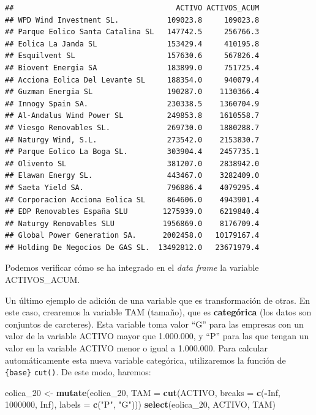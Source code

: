 \documentclass[
]{book}
\newenvironment{Shaded}{\begin{snugshade}}{\end{snugshade}}
\newcommand{\AttributeTok}[1]{\textcolor[rgb]{0.13,0.29,0.53}{#1}}
\newcommand{\ConstantTok}[1]{\textcolor[rgb]{0.56,0.35,0.01}{#1}}
\newcommand{\DecValTok}[1]{\textcolor[rgb]{0.00,0.00,0.81}{#1}}
\newcommand{\FunctionTok}[1]{\textcolor[rgb]{0.13,0.29,0.53}{\textbf{#1}}}
\newcommand{\NormalTok}[1]{#1}
\newcommand{\OtherTok}[1]{\textcolor[rgb]{0.56,0.35,0.01}{#1}}
\newcommand{\SpecialCharTok}[1]{\textcolor[rgb]{0.81,0.36,0.00}{\textbf{#1}}}
\newcommand{\StringTok}[1]{\textcolor[rgb]{0.31,0.60,0.02}{#1}}
\begin{document}
\begin{verbatim}
##                                     ACTIVO ACTIVOS_ACUM
## WPD Wind Investment SL.           109023.8     109023.8
## Parque Eolico Santa Catalina SL   147742.5     256766.3
## Eolica La Janda SL                153429.4     410195.8
## Esquilvent SL                     157630.6     567826.4
## Biovent Energia SA                183899.0     751725.4
## Acciona Eolica Del Levante SL     188354.0     940079.4
## Guzman Energia SL                 190287.0    1130366.4
## Innogy Spain SA.                  230338.5    1360704.9
## Al-Andalus Wind Power SL          249853.8    1610558.7
## Viesgo Renovables SL.             269730.0    1880288.7
## Naturgy Wind, S.L.                273542.0    2153830.7
## Parque Eolico La Boga SL.         303904.4    2457735.1
## Olivento SL                       381207.0    2838942.0
## Elawan Energy SL.                 443467.0    3282409.0
## Saeta Yield SA.                   796886.4    4079295.4
## Corporacion Acciona Eolica SL     864606.0    4943901.4
## EDP Renovables España SLU        1275939.0    6219840.4
## Naturgy Renovables SLU           1956869.0    8176709.4
## Global Power Generation SA.      2002458.0   10179167.4
## Holding De Negocios De GAS SL.  13492812.0   23671979.4
\end{verbatim}

Podemos verificar cómo se ha integrado en el \emph{data frame} la variable ACTIVOS\_ACUM.

Un último ejemplo de adición de una variable que es transformación de otras. En este caso, crearemos la variable TAM (tamaño), que es \textbf{categórica} (los datos son conjuntos de carcteres). Esta variable toma valor ``G'' para las empresas con un valor de la variable ACTIVO mayor que 1.000.000, y ``P'' para las que tengan un valor en la variable ACTIVO menor o igual a 1.000.000. Para calcular automáticamente esta nueva variable categórica, utilizaremos la función de \texttt{\{base\}} \texttt{cut()}. De este modo, haremos:

\begin{Shaded}
\begin{Highlighting}[]
\NormalTok{eolica\_20 }\OtherTok{\textless{}{-}} \FunctionTok{mutate}\NormalTok{(eolica\_20, }\AttributeTok{TAM =} \FunctionTok{cut}\NormalTok{(ACTIVO,}
  \AttributeTok{breaks =} \FunctionTok{c}\NormalTok{(}\SpecialCharTok{{-}}\ConstantTok{Inf}\NormalTok{, }\DecValTok{1000000}\NormalTok{, }\ConstantTok{Inf}\NormalTok{), }\AttributeTok{labels =} \FunctionTok{c}\NormalTok{(}\StringTok{"P"}\NormalTok{, }\StringTok{"G"}\NormalTok{)))}
\FunctionTok{select}\NormalTok{(eolica\_20, ACTIVO, TAM)}
\end{Highlighting}
\end{Shaded}
\end{document}

